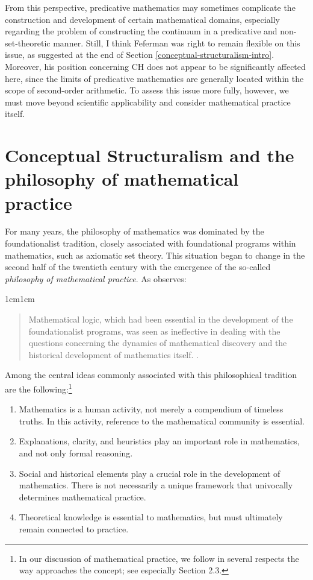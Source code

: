 \documentclass[11pt,a4paper]{book}
\theoremstyle{plain}
\begin{document}
From this perspective, predicative mathematics may sometimes complicate the construction and development of certain mathematical domains, especially regarding the problem of constructing the continuum in a predicative and non-set-theoretic manner. Still, I think Feferman was right to remain flexible on this issue, as suggested at the end of Section \ref{conceptual-structuralism-intro}. Moreover, his position concerning CH does not appear to be significantly affected here, since the limits of predicative mathematics are generally located within the scope of second-order arithmetic. To assess this issue more fully, however, we must move beyond scientific applicability and consider mathematical practice itself.

\section{Conceptual Structuralism and the philosophy of mathematical practice}
\label{mathematical-practice}

For many years, the philosophy of mathematics was dominated by the foundationalist tradition, closely associated with foundational programs within mathematics, such as axiomatic set theory. This situation began to change in the second half of the twentieth century with the emergence of the so-called \textit{philosophy of mathematical practice}. As \textcite{Mancosu2008} observes:

\begin{adjustwidth}{1cm}{1cm}
\begin{quote}
\small
Mathematical logic, which had been essential in the development of the foundationalist programs, was seen as ineffective in dealing with the questions concerning the dynamics of mathematical discovery and the historical development of mathematics itself. \textcite[p. 4]{Mancosu2008}.
\end{quote}
\end{adjustwidth}

Among the central ideas commonly associated with this philosophical tradition are the following:\footnote{In our discussion of mathematical practice, we follow in several respects the way \textcite{Ferreiros2016} approaches the concept; see especially Section 2.3.}

\begin{enumerate}
\item Mathematics is a human activity, not merely a compendium of timeless truths. In this activity, reference to the mathematical community is essential.
\item Explanations, clarity, and heuristics play an important role in mathematics, and not only formal reasoning.
\item Social and historical elements play a crucial role in the development of mathematics. There is not necessarily a unique framework that univocally determines mathematical practice.
\item Theoretical knowledge is essential to mathematics, but must ultimately remain connected to practice.
\end{enumerate}
\end{document}
